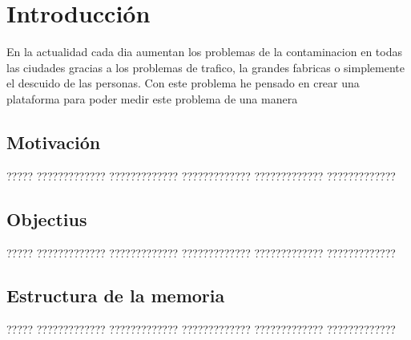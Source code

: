 
\chapter{Introducción}

En la actualidad cada dia aumentan los problemas de la contaminacion en todas las ciudades gracias a los problemas de trafico, la grandes fabricas o simplemente el descuido de las personas. 
Con este problema he pensado en crear una plataforma para poder medir este problema de una manera  

\section{Motivación}

????? ????????????? ????????????? ????????????? ????????????? ????????????? 

\section{Objectius}

????? ????????????? ????????????? ????????????? ????????????? ?????????????

\section{Estructura de la memoria}

????? ????????????? ????????????? ????????????? ????????????? ????????????? 

